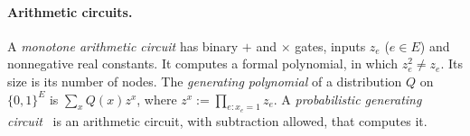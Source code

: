 \paragraph{Arithmetic circuits.} A \emph{monotone arithmetic circuit} has binary $+$ and $\times$ gates, inputs $z_e$ ($e\in E$) and nonnegative real constants. It computes a formal polynomial, in which $z_e^2\ne z_e$. Its size is its number of nodes. The \emph{generating polynomial} of a distribution $Q$ on $\{0,1\}^E$ is $\sum_xQ(x)z^x$, where $z^x:=\prod_{e:x_e=1}z_e$. A \emph{probabilistic generating circuit}~\cite{ZhangJubaVdB21} is an arithmetic circuit, with subtraction allowed, that computes it.
